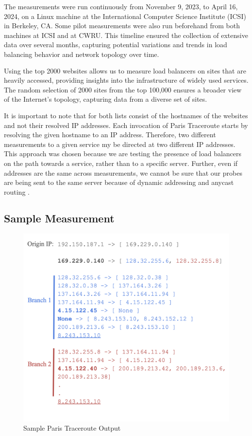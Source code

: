 \documentclass[12pt]{cwru_thesis}
\begin{document}
The measurements were run continuously from November 9, 2023, to April 16, 2024, on a Linux machine at the International Computer Science Institute (ICSI) in Berkeley, CA. Some pilot measurements were also run beforehand from both machines at ICSI and at CWRU.
This timeline ensured the collection of extensive data over several months, capturing potential variations and trends in load balancing behavior and network topology over time. 

Using the top 2000 websites allows us to measure load balancers on sites that are heavily accessed, providing insights into the infrastructure of widely used services. The random selection of 2000 sites from the top 100,000 ensures a broader view of the Internet's topology, capturing data from a diverse set of sites.


It is important to note that for both lists consist of the
hostnames of the websites and not their resolved IP addresses.
Each invocation of Paris Traceroute starts by resolving the given
hostname to an IP address.  Therefore, two different measurements
to a given service my be directed at two different IP addresses.
This approach was chosen because we are testing the presence of
load balancers on the path towards a service, rather than to a
specific server.  Further, even if addresses are the same across
measurements, we cannot be sure that our probes are being sent to
the same server because of dynamic addressing \cite{dhcp} and
anycast routing \cite{anycast-routing}.



\subsection{Sample Measurement}
\begin{figure}[H]
    \centering
    \includegraphics[width=\linewidth]{figures/sample.png}
    \caption{Sample Paris Traceroute Output}
    \label{fig:sample}
\end{figure}
\end{document}
